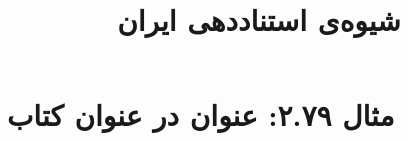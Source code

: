 \documentclass[a4paper,10pt]{article}
\begin{document}
\title{شیوه‌ی استناددهی ایران
 }
\author{}
\date{}
\maketitle



\section*{مثال ۲.۷۹: عنوان در عنوان کتاب}

\cite{کراجی1383}\\
\cite{mchugh1980}\\






\end{document}

